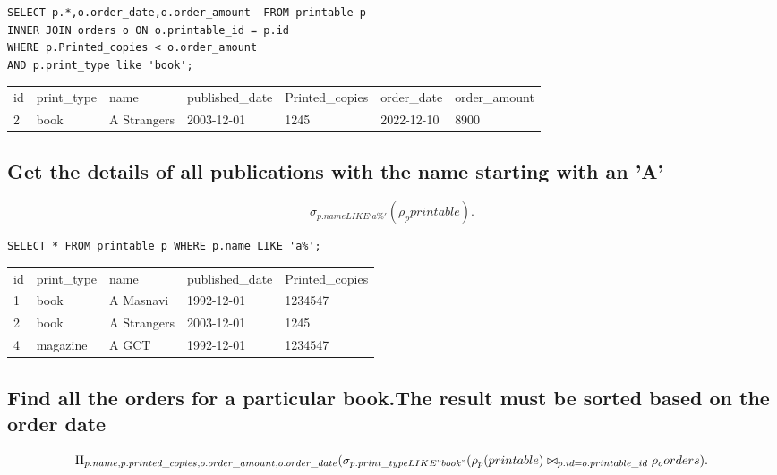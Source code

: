 \documentclass{article}
\begin{document}
\begin{lstlisting}[frame=single]
SELECT p.*,o.order_date,o.order_amount  FROM printable p 
INNER JOIN orders o ON o.printable_id = p.id 
WHERE p.Printed_copies < o.order_amount 
AND p.print_type like 'book';
\end{lstlisting}

\begin{table}[h]
\begin{tabular}{lllllll}
id & print\_type & name        & published\_date & Printed\_copies & order\_date & order\_amount \\
2  & book        & A Strangers & 2003-12-01      & 1245            & 2022-12-10  & 8900         
\end{tabular}
\end{table}


\subsection{Get the details of all publications with the name starting with an 'A'}

\[

	\sigma_{p.name LIKE 'a\%'}(\rho_pprintable)

.\]

\begin{lstlisting}[frame=single]
SELECT * FROM printable p WHERE p.name LIKE 'a%';
\end{lstlisting}
\begin{table}[h]
\begin{tabular}{lllll}
id & print\_type & name        & published\_date & Printed\_copies \\
1  & book        & A Masnavi   & 1992-12-01      & 1234547         \\
2  & book        & A Strangers & 2003-12-01      & 1245            \\
4  & magazine    & A GCT       & 1992-12-01      & 1234547        
\end{tabular}
\end{table}
\pagebreak
\subsection{Find all the orders for a particular book.The result must be sorted based on the order date}

\[

	
 \Pi_{p.name,p.printed\_copies,o.order\_amount, o.order\_date}(

  \sigma_{p.print\_type LIKE "book"}
   (\rho_p(printable) \bowtie_{p.id = o.printable\_id}
    \rho_oorders)

.\]
\end{document}
